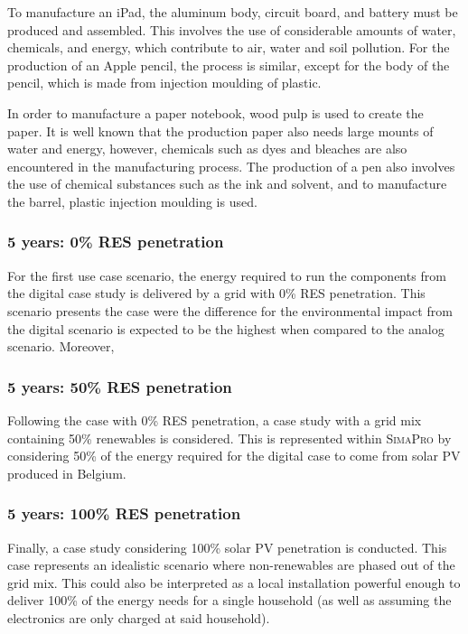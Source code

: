To manufacture an iPad, the aluminum body, circuit board, and battery must be produced and assembled. This involves the use of considerable amounts of water, chemicals, and energy, which contribute to air, water and soil pollution. For the production of an Apple pencil, the process is similar, except for the body of the pencil, which is made from injection moulding of plastic. 

In order to manufacture a paper notebook, wood pulp is used to create the paper. It is well known that the production paper also needs large mounts of water and energy, however, chemicals such as dyes and bleaches are also encountered in the manufacturing process. The production of a pen also involves the use of chemical substances such as the ink and solvent, and to manufacture the barrel, plastic injection moulding is used. 

\subsubsection*{5 years: 0\% RES penetration}
For the first use case scenario, the energy required to run the components from the digital case study is delivered by a grid with 0\% RES penetration. This scenario presents the case were the difference for the environmental impact from the digital scenario is expected to be the highest when compared to the analog scenario. Moreover, 

\subsubsection*{5 years: 50\% RES penetration}
Following the case with 0\% RES penetration, a case study with a grid mix containing 50\% renewables is considered. This is represented within \textsc{SimaPro} by considering 50\% of the energy required for the digital case to come from solar PV produced in Belgium.

\subsubsection*{5 years: 100\% RES penetration}
Finally, a case study considering 100\% solar PV penetration is conducted. This case represents an idealistic scenario where non-renewables are phased out of the grid mix. This could also be interpreted as a local installation powerful enough to deliver 100\% of the energy needs for a single household (as well as assuming the electronics are only charged at said household).